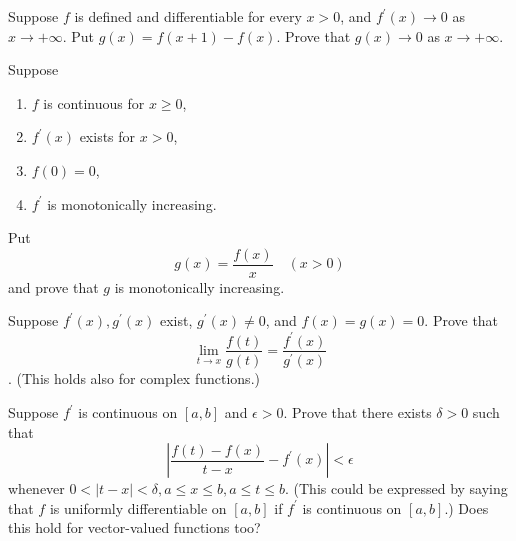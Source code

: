   \begin{exercise}[Rudin 5.5]
    Suppose $f$ is defined and differentiable for every $x > 0$, and $f^\prime(x) \to 0$ as $x \to +\infty$. Put $g(x) = f(x + 1) - f(x)$. Prove that $g(x) \to 0$ as $x \to +\infty$.
  \end{exercise}
  \begin{solution}

  \end{solution}

  \begin{exercise}[Rudin 5.6]
    Suppose
    \begin{enumerate}
      \item[(a)] $f$ is continuous for $x \ge 0$,
      \item[(b)] $f^\prime(x)$ exists for $x > 0$,
      \item[(c)] $f(0) = 0$,
      \item[(d)] $f^\prime$ is monotonically increasing.
    \end{enumerate}
    Put
    \begin{equation}
      g(x) = \frac{f(x)}{x} \quad (x > 0)
    \end{equation}
    and prove that $g$ is monotonically increasing.
  \end{exercise}
  \begin{solution}

  \end{solution}

  \begin{exercise}[Rudin 5.7]
    Suppose $f^\prime(x), g^\prime(x)$ exist, $g^\prime(x) \ne 0$, and $f(x) = g(x) = 0$. Prove that
    \begin{equation}
      \lim_{t \to x} \frac{f(t)}{g(t)} = \frac{f^\prime(x)}{g^\prime(x)}
    \end{equation}
   . (This holds also for complex functions.)
  \end{exercise}
  \begin{solution}

  \end{solution}

  \begin{exercise}[Rudin 5.8]
    Suppose $f^\prime$ is continuous on $[a, b]$ and $\epsilon > 0$. Prove that there exists $\delta > 0$ such that
    \begin{equation}
      \left| \frac{f(t) - f(x)}{t - x} - f^\prime(x) \right| < \epsilon
    \end{equation}
    whenever $0 < |t - x| < \delta, a \le x \le b, a \le t \le b$. (This could be expressed by saying that $f$ is uniformly differentiable on $[a, b]$ if $f^\prime$ is continuous on $[a, b]$.) Does this hold for vector-valued functions too?
  \end{exercise}
  \begin{solution}

  \end{solution}


